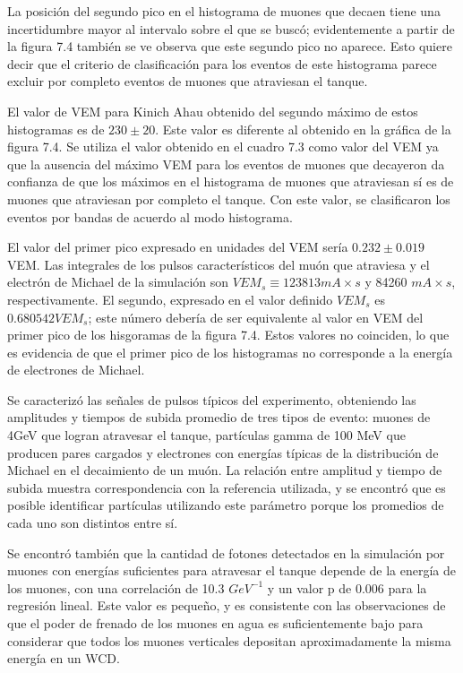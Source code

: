 \documentclass{book}
\begin{document}
La posici\'on del segundo pico en el histograma de muones que decaen tiene una incertidumbre mayor al intervalo sobre el que se busc\'o; evidentemente a partir de la figura 7.4 tambi\'en se ve observa que este segundo pico no aparece. Esto quiere decir que el criterio de clasificaci\'on para los eventos de este histograma parece excluir por completo eventos de muones que atraviesan el tanque.

El valor de VEM para Kinich Ahau obtenido del segundo m\'aximo de estos histogramas es de $230 \pm 20$. Este valor es diferente al obtenido en la gr\'afica de la figura 7.4. Se utiliza el valor obtenido en el cuadro 7.3 como valor del VEM ya que la ausencia del m\'aximo VEM para los eventos de muones que decayeron da confianza de que los m\'aximos en el histograma de muones que atraviesan s\'i es de muones que atraviesan por completo el tanque. Con este valor, se clasificaron los eventos por bandas de acuerdo al modo histograma.

El valor del primer pico expresado en unidades del VEM ser\'ia $0.232 \pm 0.019$ VEM. Las integrales de los pulsos caracter\'isticos del mu\'on que atraviesa y el electr\'on de Michael de la simulaci\'on son $VEM_s \equiv 123813 mA\times s$ y 84260 $mA\times s$, respectivamente. El segundo, expresado en el valor definido $VEM_s$ es $0.680542 VEM_s$; este n\'umero deber\'ia de ser equivalente al valor en VEM del primer pico de los hisgoramas de la figura 7.4. Estos valores no coinciden, lo que es evidencia de que el primer pico de los histogramas no corresponde a la energ\'ia de electrones de Michael.



Se caracteriz\'o las se\~nales de pulsos t\'ipicos del experimento, obteniendo las amplitudes y tiempos de subida promedio de tres tipos de evento: muones de 4GeV que logran atravesar el tanque, part\'iculas gamma de 100 MeV que producen pares cargados y electrones con energ\'ias t\'ipicas de la distribuci\'on de Michael en el decaimiento de un mu\'on. La relaci\'on entre amplitud y tiempo de subida muestra correspondencia con la referencia utilizada, y se encontr\'o que es posible identificar part\'iculas utilizando este par\'ametro porque los promedios de cada uno son distintos entre s\'i.

Se encontr\'o tambi\'en que la cantidad de fotones detectados en la simulaci\'on por muones con energ\'ias suficientes para atravesar el tanque depende de la energ\'ia de los muones, con una correlaci\'on de 10.3 $GeV^{-1}$ y un valor p de 0.006 para la regresi\'on lineal. Este valor es peque\~no, y es consistente con las observaciones de que el poder de frenado de los muones en agua es suficientemente bajo para considerar que todos los muones verticales depositan aproximadamente la misma energ\'ia en un WCD.
\end{document}
